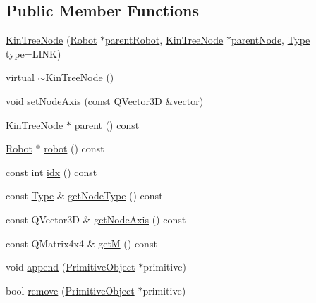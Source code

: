\subsection*{Public Member Functions}
\begin{DoxyCompactItemize}
\item 
\hyperlink{class_robot_model_1_1_kin_tree_node_a48236a64352c2187db6193069d598c86}{KinTreeNode} (\hyperlink{class_robot_model_1_1_robot}{Robot} $\ast$\hyperlink{class_robot_model_1_1_kin_tree_node_aabd31bc0263bb2a830bde65af0eba1a6}{parentRobot}, \hyperlink{class_robot_model_1_1_kin_tree_node}{KinTreeNode} $\ast$\hyperlink{class_robot_model_1_1_kin_tree_node_af2a0ed90edef2013eeadcd5b5174c420}{parentNode}, \hyperlink{class_robot_model_1_1_kin_tree_node_a6cc10fb82046bd1d9f61b806756ad176}{Type} type=LINK)
\item 
virtual \hyperlink{class_robot_model_1_1_kin_tree_node_a629cf524084ee233b402674cb371195f}{$\sim$KinTreeNode} ()
\item 
void \hyperlink{class_robot_model_1_1_kin_tree_node_ae62ad98d6c2151232c20f1542c81a38b}{setNodeAxis} (const QVector3D \&vector)
\item 
\hyperlink{class_robot_model_1_1_kin_tree_node}{KinTreeNode} $\ast$ \hyperlink{class_robot_model_1_1_kin_tree_node_a58fa5e8933de90d3f4896d39292baa39}{parent} () const 
\item 
\hyperlink{class_robot_model_1_1_robot}{Robot} $\ast$ \hyperlink{class_robot_model_1_1_kin_tree_node_a7bd810e1df470e3d8801ac8f1aa0a60f}{robot} () const 
\item 
const int \hyperlink{class_robot_model_1_1_kin_tree_node_aec76eade3020c48bd3767e5acd330a49}{idx} () const 
\item 
const \hyperlink{class_robot_model_1_1_kin_tree_node_a6cc10fb82046bd1d9f61b806756ad176}{Type} \& \hyperlink{class_robot_model_1_1_kin_tree_node_aac3f58f3a0535b2983e2b328d9eee65a}{getNodeType} () const 
\item 
const QVector3D \& \hyperlink{class_robot_model_1_1_kin_tree_node_af6a4b3bd148bf6aba766c367e13d59b6}{getNodeAxis} () const 
\item 
const QMatrix4x4 \& \hyperlink{class_robot_model_1_1_kin_tree_node_a5c91c678cc74412ec298e61a39b47e3e}{getM} () const 
\item 
void \hyperlink{class_robot_model_1_1_kin_tree_node_af043fc57074a449364d2a6ec09be46a3}{append} (\hyperlink{class_robot_model_1_1_primitive_object}{PrimitiveObject} $\ast$primitive)
\item 
bool \hyperlink{class_robot_model_1_1_kin_tree_node_ac87cf9db956705dcee63f4dbc01cc664}{remove} (\hyperlink{class_robot_model_1_1_primitive_object}{PrimitiveObject} $\ast$primitive)

\end{DoxyCompactItemize}

